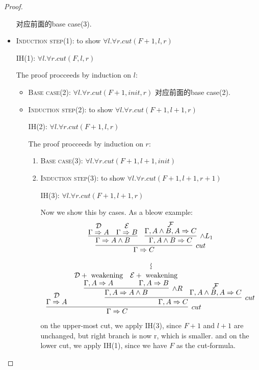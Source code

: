 \documentclass{article}
\theoremstyle{plain}
\theoremstyle{nonumberplain}
\newtheorem{proof}{Proof}
\begin{document}
\begin{proof}
\begin{itemize}
	对应前面的base case(3).
	\item \textsc{Induction step}(1): to show $\forall l. \forall r.cut(F+1,l,r)$
	
	IH(1): $\forall l. \forall r.cut(F,l,r)$
	
	The proof procceeds by induction on $l$:
	
	\begin{itemize}
		\item \textsc{Base case}(2): $\forall l. \forall r.cut(F+1,init,r)$
		对应前面的base case(2).
		\item  \textsc{Induction step}(2): to show $\forall l. \forall r.cut(F+1,l+1,r)$
		
		IH(2): $\forall l. \forall r.cut(F+1,l,r)$
		
		The proof procceeds by induction on $r$:
		
		\begin{enumerate}
			\item \textsc{Base case}(3): $\forall l. \forall r.cut(F+1,l+1,init)$
			
			\item  \textsc{Induction step}(3): to show $\forall l. \forall r.cut(F+1,l+1,r+1)$
			
			IH(3): $\forall l. \forall r.cut(F+1,l+1,r)$
			
			Now we show this by cases.  As a bleow example:
			$$
			\begin{gathered}
\infer[cut]{\Gamma \Rightarrow C}{\infer{\Gamma \Rightarrow A \wedge B}{\deduce{\Gamma \Rightarrow A}{\mathcal{D}} & \deduce{\Gamma \Rightarrow B}{\mathcal{E}}} & \infer[\wedge L_1]{\Gamma, A \wedge B \Rightarrow C}{\deduce{\Gamma, A \wedge B, A \Rightarrow C}{\mathcal{F}}}} \\
\rotatebox{270}{$\leadsto$}\\
\infer[cut]{\Gamma \Rightarrow C}{\deduce{\Gamma \Rightarrow A}{\mathcal{D}} & \infer[cut]{\Gamma, A \Rightarrow C}{ \infer[\wedge R]{\Gamma, A \Rightarrow A \wedge B}{\deduce{\Gamma, A \Rightarrow A}{\mathcal{D}+~\text{weakening}} & \deduce{\Gamma,A \Rightarrow B}{\mathcal{E}+~\text{weakening}}}& \deduce{\Gamma, A \wedge B, A \Rightarrow C}{\mathcal{F}}}}
\end{gathered}
			$$
			on the upper-most cut, we apply IH(3), since $F+1$ and $l+1$ are unchanged, but right branch is now r, which is smaller. and on the lower cut, we apply IH(1), since we have $F$ as the cut-formula.
		\end{enumerate}
	\end{itemize}	 
\end{itemize} 
\end{proof}
\end{document}
